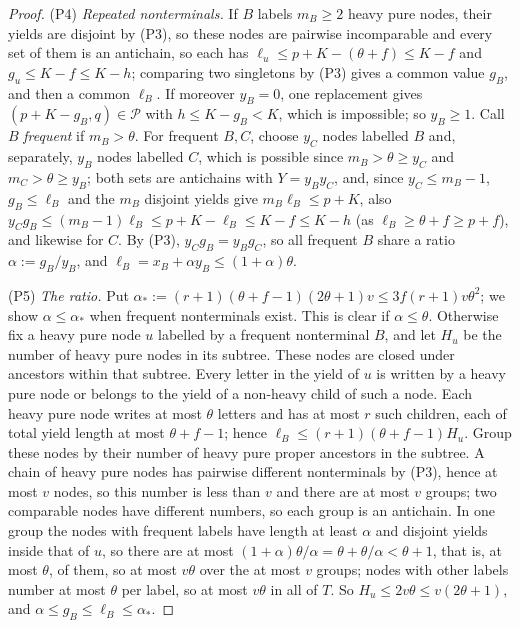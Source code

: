 \begin{proof}
(P4) \emph{Repeated nonterminals.}  If $B$ labels $m_B\ge2$ heavy pure nodes,
their yields are disjoint by (P3), so these nodes are pairwise incomparable and
every set of them is an antichain, so each has $\ell_u\le p+K-(\theta+f)\le K-f$ and
$g_u\le K-f\le K-h$; comparing two singletons by (P3) gives a common value $g_B$,
and then a common $\ell_B$.  If moreover $y_B=0$, one replacement gives
$(p+K-g_B,q)\in\mathcal P$ with $h\le K-g_B<K$, which is impossible; so $y_B\ge1$.
Call $B$ \emph{frequent} if $m_B>\theta$.  For frequent $B,C$, choose $y_C$ nodes
labelled $B$ and, separately, $y_B$ nodes labelled $C$, which is possible since
$m_B>\theta\ge y_C$ and $m_C>\theta\ge y_B$; both sets are antichains with
$Y=y_By_C$, and, since $y_C\le m_B-1$, $g_B\le\ell_B$ and the $m_B$ disjoint
yields give $m_B\ell_B\le p+K$, also $y_Cg_B\le(m_B-1)\ell_B\le p+K-\ell_B\le
K-f\le K-h$ (as $\ell_B\ge\theta+f\ge p+f$), and likewise for $C$.  By (P3), $y_Cg_B=y_Bg_C$, so all frequent $B$ share a ratio
$\alpha:=g_B/y_B$, and $\ell_B=x_B+\alpha y_B\le(1+\alpha)\theta$.

(P5) \emph{The ratio.}  Put $\alpha_*:=(r+1)(\theta+f-1)(2\theta+1)v\le3f(r+1)v\theta^2$;
we show $\alpha\le\alpha_*$ when frequent nonterminals exist.  This is clear if
$\alpha\le\theta$.  Otherwise fix a heavy pure node $u$ labelled by a frequent
nonterminal $B$, and let $H_u$ be the number of heavy pure nodes in its subtree.
These nodes are closed under ancestors within that subtree.  Every letter in the
yield of $u$ is written by a heavy pure node or belongs to the yield of a
non-heavy child of such a node.  Each heavy pure node writes at most $\theta$
letters and has at most $r$ such children, each of total yield length at most
$\theta+f-1$; hence $\ell_B\le(r+1)(\theta+f-1)H_u$.  Group these nodes by their
number of heavy pure proper ancestors in the subtree.  A chain of heavy pure
nodes has pairwise different nonterminals by (P3), hence at most $v$ nodes, so
this number is less than $v$ and there are at most $v$ groups; two comparable
nodes have different numbers, so each group is an antichain.  In one group the nodes with frequent labels have
length at least $\alpha$ and disjoint yields inside that of $u$, so there are at
most $(1+\alpha)\theta/\alpha=\theta+\theta/\alpha<\theta+1$, that is, at most
$\theta$, of them, so at most $v\theta$ over the at most $v$ groups; nodes with
other labels number at most $\theta$ per label, so at most $v\theta$ in all of
$T$.  So $H_u\le2v\theta\le v(2\theta+1)$, and
$\alpha\le g_B\le\ell_B\le\alpha_*$.


\end{proof}
